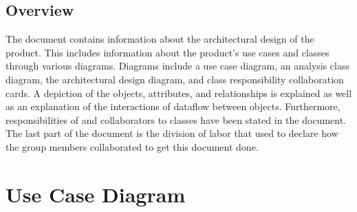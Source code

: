 \documentclass[12pt]{article}
\begin{document}
\subsection{Overview}
\label{sub:overview}
The document contains information about the architectural design of the product. This includes information about the product’s use cases and classes through various diagrams. Diagrams include a use case diagram, an analysis class diagram, the architectural design diagram, and class responsibility collaboration cards. A depiction of the objects, attributes, and relationships is explained as well as an explanation of the interactions of dataflow between objects. Furthermore, responsibilities of and collaborators to classes have been stated in the document. The last part of the document is the division of labor that used to declare how the group members collaborated to get this document done.


\section{Use Case Diagram}
\label{sec:use_case_diagram}
\end{document}
